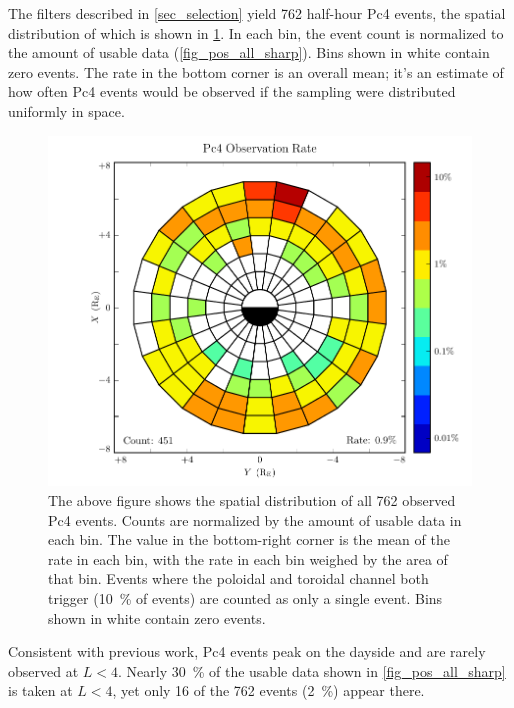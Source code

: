 The filters described in \cref{sec_selection} yield 762 half-hour Pc4 events,
the spatial
distribution of which is shown in \cref{fig_rate_all_sharp}. In each bin, the
event count is normalized to the amount of usable data
(\cref{fig_pos_all_sharp}). Bins shown in white contain zero events. The rate
in the bottom corner is an overall mean; it's an estimate of how often Pc4
events would be observed if the sampling were distributed uniformly in space.

\begin{figure}[!htb]
  \centering
  \includegraphics[width=\textwidth]{figures/rate_all_sharp.pdf}
  \caption[Rate of Pc4 Events]{
    The above figure shows the spatial distribution of all 762 observed Pc4
    events. Counts are normalized by the amount of usable data in each bin. The
    value in the bottom-right corner is the mean of the rate in each bin, with
    the rate in each bin weighed by the area of that bin. Events where the
    poloidal and toroidal channel both trigger (\about\SI{10}{\percent} of
    events) are counted as only a single event. Bins shown in white contain
    zero events. 
  }
  \label{fig_rate_all_sharp}
\end{figure}

Consistent with previous
work\cite{anderson_1990,dai_2015,kokubun_1989,liu_2009}, Pc4 events peak on the
dayside and are rarely
observed at $L < 4$. Nearly \SI{30}{\percent} of the usable data shown in
\cref{fig_pos_all_sharp} is taken at $L < 4$, yet only 16 of the 762 events
(\SI{2}{\percent}) appear there. 

